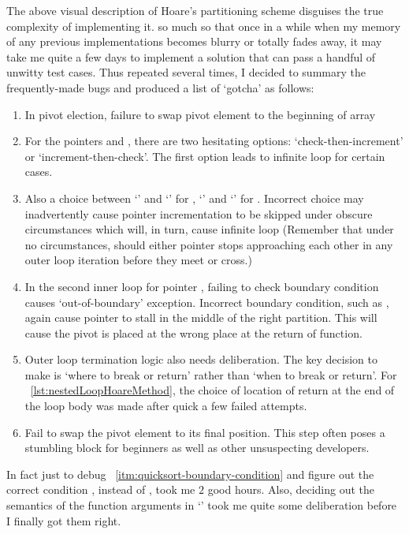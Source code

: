 The above visual description of Hoare's partitioning scheme disguises the true complexity of
implementing it.
so much so that once in a while when my memory of any previous implementations becomes blurry or
totally fades away, it may take me quite a few days to implement a solution that can pass a
handful of unwitty test cases.
Thus repeated several times, I decided to summary the frequently-made bugs and produced a list of
`gotcha' as follows:
\begin{enumerate}
    \item In pivot election, failure to swap pivot element to the beginning of array
    \item For the pointers  and , there are two hesitating options:
    `check-then-increment' or `increment-then-check'.
    The first option leads to infinite loop for certain cases.
    \item Also a choice between `' and `' for ,
    `' and `' for .
    Incorrect choice may inadvertently cause pointer incrementation to be skipped under
    obscure circumstances which will, in turn, cause infinite loop
    (Remember that under no circumstances, should either pointer stops approaching each other in
    any outer loop iteration before they meet or cross.)
    \item\label{itm:quicksort-boundary-condition} In the second inner loop for pointer ,
    failing to check boundary condition causes `out-of-boundary' exception.
    Incorrect boundary condition, such as , again cause pointer  to stall
    in the middle of the right partition.
    This will cause the pivot is placed at the wrong place at the return of function.
    \item Outer loop termination logic also needs deliberation.
    The key decision to make is `where to break or return' rather than `when to break or return'.
    For ~\autoref{lst:nestedLoopHoareMethod}, the choice of location of return
    at the end of the loop body was made after quick a few failed attempts.
    \item Fail to swap the pivot element to its final position.
    This step often poses a stumbling block for beginners as well as other unsuspecting
    developers.
\end{enumerate}
In fact just to debug ~\autoref{itm:quicksort-boundary-condition} and
figure out the correct condition , instead of , took me $2$ good hours.
Also, deciding out the semantics of the function arguments in `' took me
quite some deliberation before I finally got them right.


